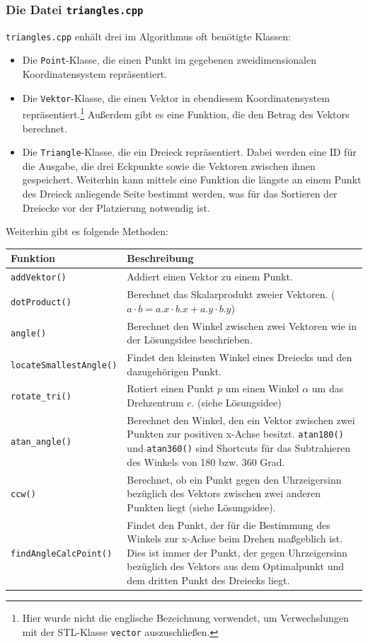 \documentclass[a4paper, notitlepage, 12pt]{scrartcl}
\begin{document}
\subsubsection{Die Datei \texttt{triangles.cpp}}
\texttt{triangles.cpp} enhält drei im Algorithmus oft benötigte Klassen:
\begin{itemize}
	\item Die \texttt{Point}-Klasse, die einen Punkt im gegebenen zweidimensionalen Koordinatensystem repräsentiert.
	\item Die \texttt{Vektor}-Klasse, die einen Vektor in ebendiesem Koordinatensystem repräsentiert.\footnote{Hier wurde nicht die englische Bezeichnung verwendet, um Verwechslungen mit der STL-Klasse \texttt{vector} auszuschließen.} Außerdem gibt es eine Funktion, die den Betrag des Vektors berechnet.
	\item Die \texttt{Triangle}-Klasse, die ein Dreieck repräsentiert. Dabei werden eine ID für die Ausgabe, die drei Eckpunkte sowie die Vektoren zwischen ihnen gespeichert. Weiterhin kann mittels eine Funktion die längste an einem Punkt des Dreieck anliegende Seite bestimmt werden, was für das Sortieren der Dreiecke vor der Platzierung notwendig ist.
\end{itemize}
Weiterhin gibt es folgende Methoden:
\begin{longtabu} to \linewidth {lX}
	Funktion & Beschreibung \\ \hline \hline \endhead
	\texttt{addVektor()} & Addiert einen Vektor zu einem Punkt. \\ \hline
	\texttt{dotProduct()} & Berechnet das Skalarprodukt zweier Vektoren. ($a \cdot b = a.x \cdot b.x + a.y \cdot b.y$) \\ \hline
	\texttt{angle()} & Berechnet den Winkel zwischen zwei Vektoren wie in der Lösungsidee beschrieben.\\ \hline
	\texttt{locateSmallestAngle()} &  Findet den kleinsten Winkel eines Dreiecks und den dazugehörigen Punkt.\\ \hline
	\texttt{rotate\_tri()} & Rotiert einen Punkt $p$ um einen Winkel $\alpha$ um das Drehzentrum $c$. (siehe Lösungsidee)\\ \hline
	\texttt{atan\_angle()}& Berechnet den Winkel, den ein Vektor zwischen zwei Punkten zur positiven x-Achse besitzt. \texttt{atan180()} und \texttt{atan360()} sind Shortcuts für das Subtrahieren des Winkels von 180 bzw. 360 Grad. \\ \hline
	\texttt{ccw()} & Berechnet, ob ein Punkt gegen den Uhrzeigersinn bezüglich des Vektors zwischen zwei anderen Punkten liegt (siehe Lösungsidee).\\ \hline
	\texttt{findAngleCalcPoint()} & Findet den Punkt, der für die Bestimmung des Winkels zur x-Achse beim Drehen maßgeblich ist. Dies ist immer der Punkt, der gegen Uhrzeigersinn bezüglich des Vektors aus dem Optimalpunkt und dem dritten Punkt des Dreiecks liegt.\\
\end{longtabu}
\end{document}
